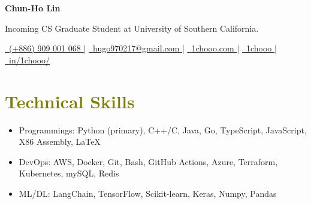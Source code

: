 \documentclass[a4paper, 11pt]{article}
\makeatletter
\newcommand{\name}{Chun-Ho Lin} %
\newcommand{\phone}{909 001 068} %
\newcommand{\emaila}{hugo970217@gmail.com} %
\newcommand{\announcement}{Incoming CS Graduate Student at University of Southern California.}
\makeatother
\begin{document}
\selectfont

\setlength{\footskip}{4.08003pt}

\begin{center}
    \textbf{\huge \name}
\end{center}

\begin{center}
    \announcement
\end{center}

\begin{center}
    \href{tel:+886-\phone}{
        \underline{
            \raisebox{0.0\height}{\footnotesize \faPhone}\
            {(+886) \phone}
        }
    } |
    \href{mailto:\emaila}{
        \underline{
            \raisebox{0.0\height}{\footnotesize \faEnvelope}\
            {\emaila}
        }
    } |
    \href{https://www.1chooo.com/}{
        \underline{
            \raisebox{0.0\height}{\footnotesize \faGlobe}\
            {1chooo.com}
        }
    } |
    \href{https://github.com/1chooo}{
        \underline{
            \raisebox{0.0\height}{\footnotesize \faGithub}\
            {1chooo}
        }
    } |
    \href{https://www.linkedin.com/in/1chooo/}{
        \underline{
            \raisebox{0.0\height}{\footnotesize \faLinkedin}\
            {in/1chooo/}
        }
    }
\end{center}
  
\vspace{-4.0mm}




\vspace{-5.5mm}

\section{\textcolor{olive}{\textbf{Technical Skills}}}

    \vspace{1.0mm}

    \begin{itemize}[
        leftmargin=0.20in, 
        label={-}, 
        itemsep=-2pt, 
        topsep=0pt,
        rightmargin=0.10in
    ]
        \item Programmings: Python (primary), C++/C, Java, Go, TypeScript, JavaScript, X86 Assembly, \LaTeX
        \item DevOps: AWS, Docker, Git, Bash, GitHub Actions, Azure, Terraform, Kubernetes, mySQL, Redis
        \item ML/DL: LangChain, TensorFlow, Scikit-learn, Keras, Numpy, Pandas
    \end{itemize}
\end{document}
